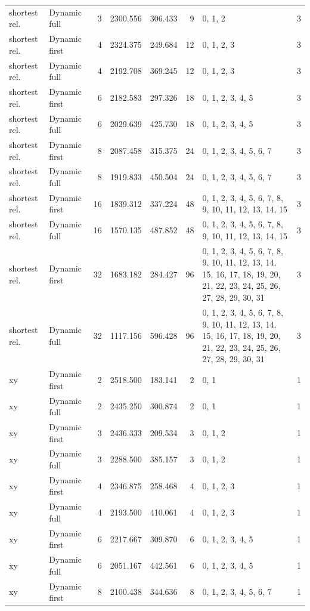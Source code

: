 \documentclass[10pt,a4paper]{article}
\begin{document}
\begin{longtable}{@{}p{23mm}p{29mm}rrrrp{36mm}r@{}}
shortest rel. & Dynamic full & 3 & 2300.556 & 306.433 & 9 & 0, 1, 2 & 3 \\
shortest rel. & Dynamic first & 4 & 2324.375 & 249.684 & 12 & 0, 1, 2, 3 & 3 \\
shortest rel. & Dynamic full & 4 & 2192.708 & 369.245 & 12 & 0, 1, 2, 3 & 3 \\
shortest rel. & Dynamic first & 6 & 2182.583 & 297.326 & 18 & 0, 1, 2, 3, 4, 5 & 3 \\
shortest rel. & Dynamic full & 6 & 2029.639 & 425.730 & 18 & 0, 1, 2, 3, 4, 5 & 3 \\
shortest rel. & Dynamic first & 8 & 2087.458 & 315.375 & 24 & 0, 1, 2, 3, 4, 5, 6, 7 & 3 \\
shortest rel. & Dynamic full & 8 & 1919.833 & 450.504 & 24 & 0, 1, 2, 3, 4, 5, 6, 7 & 3 \\
shortest rel. & Dynamic first & 16 & 1839.312 & 337.224 & 48 & 0, 1, 2, 3, 4, 5, 6, 7, 8, 9, 10, 11, 12, 13, 14, 15 & 3 \\
shortest rel. & Dynamic full & 16 & 1570.135 & 487.852 & 48 & 0, 1, 2, 3, 4, 5, 6, 7, 8, 9, 10, 11, 12, 13, 14, 15 & 3 \\
shortest rel. & Dynamic first & 32 & 1683.182 & 284.427 & 96 & 0, 1, 2, 3, 4, 5, 6, 7, 8, 9, 10, 11, 12, 13, 14, 15, 16, 17, 18, 19, 20, 21, 22, 23, 24, 25, 26, 27, 28, 29, 30, 31 & 3 \\
shortest rel. & Dynamic full & 32 & 1117.156 & 596.428 & 96 & 0, 1, 2, 3, 4, 5, 6, 7, 8, 9, 10, 11, 12, 13, 14, 15, 16, 17, 18, 19, 20, 21, 22, 23, 24, 25, 26, 27, 28, 29, 30, 31 & 3 \\
xy & Dynamic first & 2 & 2518.500 & 183.141 & 2 & 0, 1 & 1 \\
xy & Dynamic full & 2 & 2435.250 & 300.874 & 2 & 0, 1 & 1 \\
xy & Dynamic first & 3 & 2436.333 & 209.534 & 3 & 0, 1, 2 & 1 \\
xy & Dynamic full & 3 & 2288.500 & 385.157 & 3 & 0, 1, 2 & 1 \\
xy & Dynamic first & 4 & 2346.875 & 258.468 & 4 & 0, 1, 2, 3 & 1 \\
xy & Dynamic full & 4 & 2193.500 & 410.061 & 4 & 0, 1, 2, 3 & 1 \\
xy & Dynamic first & 6 & 2217.667 & 309.870 & 6 & 0, 1, 2, 3, 4, 5 & 1 \\
xy & Dynamic full & 6 & 2051.167 & 442.561 & 6 & 0, 1, 2, 3, 4, 5 & 1 \\
xy & Dynamic first & 8 & 2100.438 & 344.636 & 8 & 0, 1, 2, 3, 4, 5, 6, 7 & 1 \\

\end{longtable}
\end{document}
